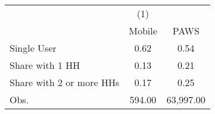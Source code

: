 \begin{tabular}{lcc}
                    &\multicolumn{1}{c}{(1)}&            \\
                    &      Mobile&        PAWS\\
\hline
Single User         &        0.62&        0.54\\
Share with 1 HH     &        0.13&        0.21\\
Share with 2 or more HHs&        0.17&        0.25\\
Obs.                &      594.00&   63,997.00\\
\end{tabular}

